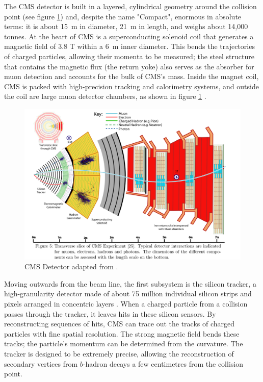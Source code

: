 The CMS detector is built in a layered, cylindrical geometry around the collision point (see figure \ref{fig:cms_overview}) and, despite the name "Compact", enormous in absolute terms: it is about 15~m in diameter, 21~m in length, and weighs about 14,000 tonnes. At the heart of CMS is a superconducting solenoid coil that generates a magnetic field of 3.8 T within a 6~m inner diameter. This bends the trajectories of charged particles, allowing their momenta to be measured; the steel structure that contains the magnetic flux (the return yoke) also serves as the absorber for muon detection and accounts for the bulk of CMS’s mass. Inside the magnet coil, CMS is packed with high-precision tracking and calorimetry systems, and outside the coil are large muon detector chambers, as shown in figure \ref{fig:cms_overview} \cite{CMS}.

\begin{figure}[h]
\centering
    \includegraphics[width=15cm]{media/cms_cutview.png}
    \caption{CMS Detector adapted from \cite{Sirunyan_2017}.}
    \label{fig:cms_overview}
\end{figure}

Moving outwards from the beam line, the first subsystem is the silicon tracker, a high-granularity detector made of about 75 million individual silicon strips and pixels arranged in concentric layers \cite{CMS}. When a charged particle from a collision passes through the tracker, it leaves hits in these silicon sensors. By reconstructing sequences of hits, CMS can trace out the tracks of charged particles with fine spatial resolution. The strong magnetic field bends these tracks; the particle’s momentum can be determined from the curvature. The tracker is designed to be extremely precise, allowing the reconstruction of secondary vertices from $b$-hadron decays a few centimetres from the collision point.

